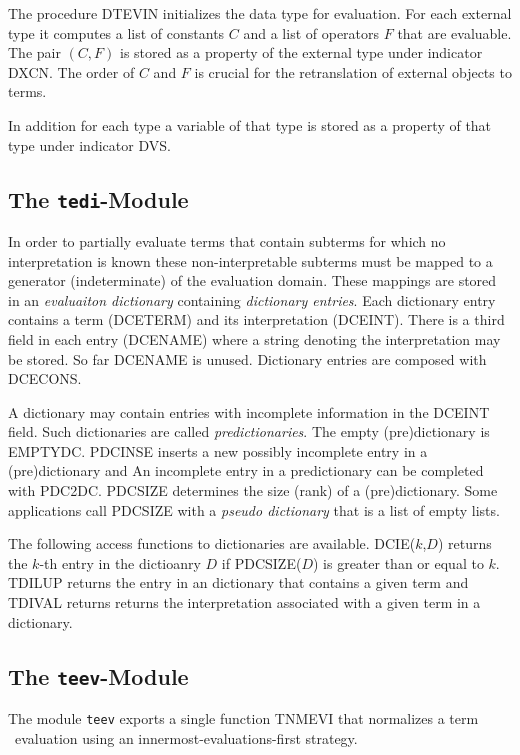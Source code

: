 The procedure DTEVIN initializes the data type for evaluation.
For each external type it computes a list of constants $C$ and a list of 
operators $F$ that are evaluable. 
The pair $(C,F)$ is stored as a property of the external type under 
indicator DXCN.
The order of $C$ and $F$ is crucial for the retranslation of external
objects to terms.

In addition for each type a variable of that type is stored as a
property of that type under indicator DVS.

\subsection{The {\tt tedi}-Module}

In order to partially evaluate  terms that contain subterms for which no 
interpretation  is known these non-interpretable subterms must be mapped to
a generator (indeterminate) of the evaluation domain.
These mappings are stored in an \emph{evaluaiton dictionary}
containing \emph{dictionary entries}.
Each dictionary entry contains a term (DCETERM) and its interpretation
(DCEINT).
There is a third field in each entry (DCENAME) where a string 
denoting the interpretation  may be stored.
So far DCENAME  is unused.
Dictionary entries are composed with DCECONS.

A dictionary may contain entries with incomplete information in the DCEINT 
field.
Such dictionaries are called \emph{predictionaries}.
The empty (pre)dictionary is EMPTYDC.
PDCINSE inserts a new possibly incomplete entry in a (pre)dictionary and
An incomplete entry in a predictionary can be completed with PDC2DC.
PDCSIZE determines the size (rank) of a (pre)dictionary.
Some applications call PDCSIZE with a 
\emph{pseudo dictionary} that is a list of empty lists.

The following access functions to dictionaries are available.
DCIE($k$,$D$) returns the $k$-th entry in the dictioanry $D$ if
PDCSIZE($D$) is greater than or equal to $k$.
TDILUP returns the entry in an dictionary that contains a given term
and TDIVAL returns returns the interpretation associated with a given
term in a dictionary.

\subsection{The {\tt teev}-Module}

The module {\tt teev} exports a single function TNMEVI that normalizes
a term \wrt\ evaluation using an innermost-evaluations-first strategy.

